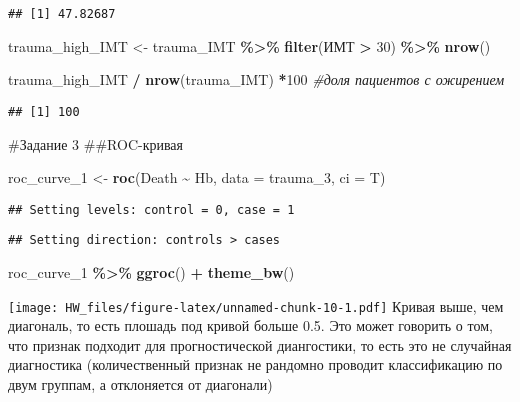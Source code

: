\documentclass[
]{article}
\newenvironment{Shaded}{\begin{snugshade}}{\end{snugshade}}
\newcommand{\AttributeTok}[1]{\textcolor[rgb]{0.13,0.29,0.53}{#1}}
\newcommand{\CommentTok}[1]{\textcolor[rgb]{0.56,0.35,0.01}{\textit{#1}}}
\newcommand{\DecValTok}[1]{\textcolor[rgb]{0.00,0.00,0.81}{#1}}
\newcommand{\FunctionTok}[1]{\textcolor[rgb]{0.13,0.29,0.53}{\textbf{#1}}}
\newcommand{\NormalTok}[1]{#1}
\newcommand{\OtherTok}[1]{\textcolor[rgb]{0.56,0.35,0.01}{#1}}
\newcommand{\SpecialCharTok}[1]{\textcolor[rgb]{0.81,0.36,0.00}{\textbf{#1}}}
\begin{document}
\begin{verbatim}
## [1] 47.82687
\end{verbatim}

\begin{Shaded}
\begin{Highlighting}[]
\NormalTok{trauma\_high\_IMT }\OtherTok{\textless{}{-}}\NormalTok{ trauma\_IMT }\SpecialCharTok{\%\textgreater{}\%}
  \FunctionTok{filter}\NormalTok{(ИМТ }\SpecialCharTok{\textgreater{}} \DecValTok{30}\NormalTok{) }\SpecialCharTok{\%\textgreater{}\%}
  \FunctionTok{nrow}\NormalTok{()}

\NormalTok{trauma\_high\_IMT }\SpecialCharTok{/} \FunctionTok{nrow}\NormalTok{(trauma\_IMT) }\SpecialCharTok{*}\DecValTok{100} \CommentTok{\#доля пациентов с ожирением}
\end{Highlighting}
\end{Shaded}

\begin{verbatim}
## [1] 100
\end{verbatim}

\#Задание 3 \#\#ROC-кривая

\begin{Shaded}
\begin{Highlighting}[]
\NormalTok{roc\_curve\_1 }\OtherTok{\textless{}{-}} \FunctionTok{roc}\NormalTok{(Death }\SpecialCharTok{\textasciitilde{}}\NormalTok{ Hb, }
                   \AttributeTok{data =}\NormalTok{ trauma\_3,}
                   \AttributeTok{ci =}\NormalTok{ T)}
\end{Highlighting}
\end{Shaded}

\begin{verbatim}
## Setting levels: control = 0, case = 1
\end{verbatim}

\begin{verbatim}
## Setting direction: controls > cases
\end{verbatim}

\begin{Shaded}
\begin{Highlighting}[]
\NormalTok{roc\_curve\_1 }\SpecialCharTok{\%\textgreater{}\%} 
    \FunctionTok{ggroc}\NormalTok{() }\SpecialCharTok{+} 
    \FunctionTok{theme\_bw}\NormalTok{()}
\end{Highlighting}
\end{Shaded}

\texttt{[image: HW\_files/figure-latex/unnamed-chunk-10-1.pdf]} Кривая
выше, чем диагональ, то есть плошадь под кривой больше 0.5. Это может
говорить о том, что признак подходит для прогностической диангостики, то
есть это не случайная диагностика (количественный признак не рандомно
проводит классификацию по двум группам, а отклоняется от диагонали)
\end{document}
